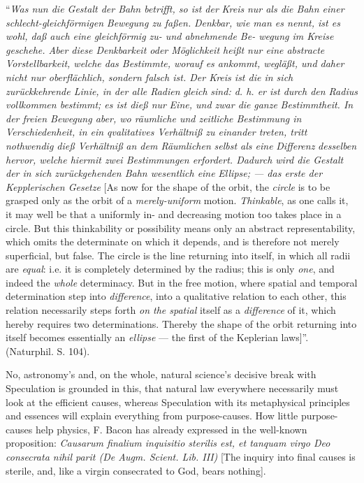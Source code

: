 \documentclass[12pt]{book}
\begin{document}
``\textit{Was nun die Gestalt der Bahn betrifft, so ist der} \emph{Kreis} \textit{nur als die Bahn einer}
\emph{schlecht-gleichförmigen} \textit{Bewegung zu faßen.} \emph{Denkbar}\textit{, wie man es nennt, ist es
wohl, daß auch eine gleichförmig zu- und abnehmende Be-
wegung im Kreise geschehe. Aber diese Denkbarkeit oder Möglichkeit heißt nur eine abstracte
Vorstellbarkeit, welche das Bestimmte, worauf es ankommt, wegläßt, und daher nicht nur oberflächlich,
sondern falsch ist. Der Kreis ist die in sich zurückkehrende Linie, in der alle Radien} \emph{gleich}
\textit{sind: d. h. er ist durch den Radius vollkommen bestimmt; es ist dieß nur} \emph{Eine}\textit{, und
zwar die} \emph{ganze} \textit{Bestimmtheit. In der freien Bewegung aber, wo räumliche und zeitliche
Bestimmung in} \emph{Verschiedenheit}\textit{, in ein qvalitatives Verhältniß zu einander treten, tritt
nothwendig dieß Verhältniß} \emph{an dem Räumlichen} \textit{selbst als eine} \emph{Differenz} \textit{desselben
hervor, welche hiermit zwei Bestimmungen erfordert. Dadurch wird die Gestalt der in sich zurückgehenden
Bahn wesentlich eine} \emph{Ellipse}\textit{; --- das erste der Kepplerischen Gesetze} [As now for the shape
of the orbit, the \emph{circle} is to be grasped only as the orbit of a \emph{merely-uniform} motion.
\emph{Thinkable}, as one calls it, it may well be that a uniformly in- and decreasing motion too takes place
in a circle. But this thinkability or possibility means only an abstract representability, which omits the
determinate on which it depends, and is therefore not merely superficial, but false. The circle is the
line returning into itself, in which all radii are \emph{equal}: i.e. it is completely determined by the
radius; this is only \emph{one}, and indeed the \emph{whole} determinacy. But in the free motion, where
spatial and temporal determination step into \emph{difference}, into a qualitative relation to each other,
this relation necessarily steps forth \emph{on the spatial} itself as a \emph{difference} of it, which
hereby requires two determinations. Thereby the shape of the orbit returning into itself becomes
essentially an \emph{ellipse} --- the first of the Keplerian laws]''. (Naturphil. S. 104).

No, astronomy's and, on the whole, natural science's decisive break with Speculation is grounded in this,
that natural law everywhere necessarily must look at the efficient causes, whereas Speculation with its
metaphysical principles and essences will explain everything from purpose-causes. How little
purpose-causes help physics, F. Bacon has already expressed in the well-known proposition: \textit{Causarum
finalium inquisitio sterilis est, et tanquam virgo Deo consecrata nihil parit (De Augm. Scient. Lib. III)}
[The inquiry into final causes is sterile, and, like a virgin consecrated to God, bears nothing].
\end{document}
